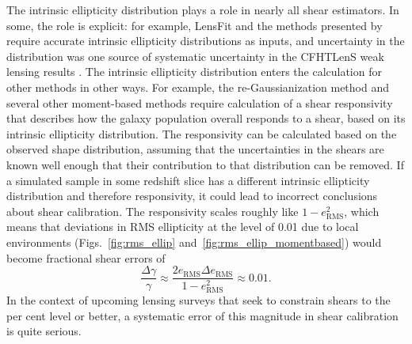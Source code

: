 \documentclass[twocolumn,useAMS,usenatbib]{mn2e}
\begin{document}
The intrinsic ellipticity distribution plays a role in nearly all
shear estimators.  In some, the role is explicit: for example, LensFit
\citep{2007MNRAS.382..315M,2008MNRAS.390..149K,2013MNRAS.429.2858M}
and the methods presented by \cite{2014MNRAS.438.1880B} require
accurate intrinsic ellipticity distributions as inputs, and
uncertainty in the distribution was one source of
systematic uncertainty in the CFHTLenS weak lensing results
\citep{2013MNRAS.432.2433H,2013MNRAS.429.2858M}.  The intrinsic
ellipticity distribution enters the calculation for other methods in
other ways.  For example, the re-Gaussianization method and several
other moment-based methods require calculation of a shear responsivity
\citep{BJ02,HS03} that describes how the galaxy population overall
responds to a shear, based on its intrinsic ellipticity distribution.
The responsivity can be calculated based on the observed shape
distribution, assuming that the uncertainties in the shears are known
well enough that their contribution to that distribution can be removed.
If a simulated sample in some redshift slice has a different intrinsic
ellipticity distribution and therefore responsivity, it could lead to
incorrect conclusions about shear calibration.  The responsivity
scales roughly like $1-e_\text{RMS}^2$, which means that deviations in
RMS ellipticity at the level of 0.01 due to local environments (Figs.~\ref{fig:rms_ellip} and~\ref{fig:rms_ellip_momentbased}) would become fractional shear
errors of
\begin{equation}
\frac{\Delta\gamma}{\gamma} \approx \frac{2 e_\text{RMS} \Delta
  e_\text{RMS} }{1-e_\text{RMS}^2} \approx 0.01.
\end{equation}
In the context of upcoming lensing surveys that seek to constrain
shears to the per cent level or better, a systematic error of this
magnitude in shear calibration is quite serious.
\end{document}
